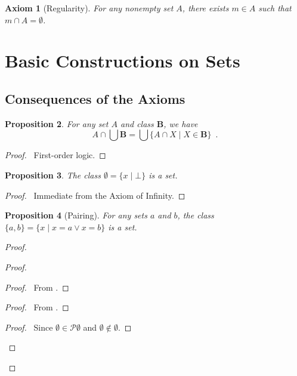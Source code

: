 \documentclass{book}
\let\qed\relax
\newtheorem{ax}{Axiom}[section]
\newtheorem{prop}[ax]{Proposition}
\theoremstyle{definition}
\begin{document}
\begin{ax}[Regularity]
For any nonempty set $A$, there exists $m \in A$ such that $m \cap A = \emptyset$.
\end{ax}

\section{Basic Constructions on Sets}

\subsection{Consequences of the Axioms}

\begin{prop}
\label{prop:capbigcup}
For any set $A$ and class $\mathbf{B}$, we have
\[ A \cap \bigcup \mathbf{B} = \bigcup \{ A \cap X \mid X \in \mathbf{B} \} \enspace . \]
\end{prop}

\begin{proof}
\pf\ First-order logic. \qed
\end{proof}

\begin{prop}
The class $\emptyset = \{x \mid \bot \}$ is a set.
\end{prop}

\begin{proof}
\pf\ Immediate from the Axiom of Infinity. \qed
\end{proof}

\begin{prop}[Pairing]
For any sets $a$ and $b$, the class $\{a,b\} = \{x \mid x = a \vee x = b\}$ is a set.
\end{prop}

\begin{proof}
\pf
{}
\begin{proof}
	\begin{proof}
		\pf\ From .
	\end{proof}
	\begin{proof}
		\pf\ From .
	\end{proof}
	\begin{proof}
		\pf\ Since $\emptyset \in \mathcal{P} \emptyset$ and $\emptyset \notin \emptyset$.
	\end{proof}
\end{proof}
\qed
\end{proof}
\end{document}
